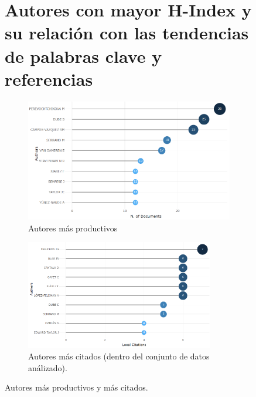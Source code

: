 \begin{figure}[ht]
	\section{Autores con mayor H-Index y su relación con las tendencias de palabras clave y referencias}
	\centering
	\begin{subfigure}[b]{0.48\textwidth}
		\centering
		\includegraphics[width=.9\textwidth]{imagenes/au_productivos.png}
		\caption{Autores más productivos}
		\label{fig:au_productivos}   
	\end{subfigure}
	\hfill
	\begin{subfigure}[b]{0.48\textwidth}
		\centering
		\includegraphics[width=0.9\textwidth]{imagenes/au_citados.png}
		\caption{Autores más citados (dentro del conjunto de datos análizado).}
		\label{fig:au_citados} 
	\end{subfigure}
	\caption{Autores más productivos y más citados.}
	\label{fig:autores} 
\end{figure}

